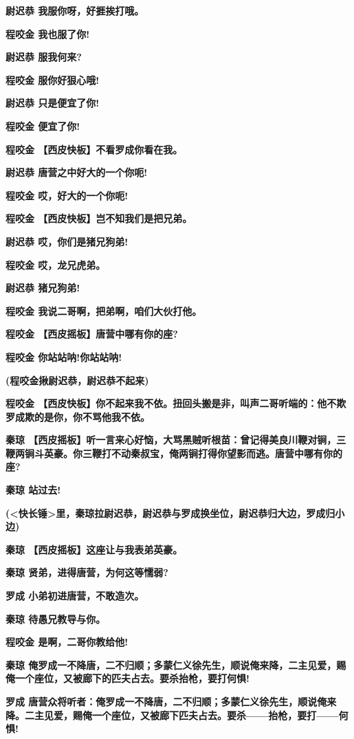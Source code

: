 \textbf{尉迟恭 我服你呀，好捱挨打哦。}

\textbf{程咬金 我也服了你!}

\textbf{尉迟恭 服我何来?}

\textbf{程咬金 服你好狠心哦!}

\textbf{尉迟恭 只是便宜了你!}

\textbf{程咬金 便宜了你!}

\textbf{程咬金 【西皮快板】不看罗成你看在我。}

\textbf{尉迟恭 唐营之中好大的一个你呃!}

\textbf{程咬金 哎，好大的一个你呃!}

\textbf{程咬金 【西皮快板】岂不知我们是把兄弟。}

\textbf{尉迟恭 哎，你们是猪兄狗弟!}

\textbf{程咬金 哎，龙兄虎弟。}

\textbf{尉迟恭 猪兄狗弟!}

\textbf{程咬金 我说二哥啊，把弟啊，咱们大伙打他。}

\textbf{程咬金 【西皮摇板】唐营中哪有你的座?}

\textbf{程咬金 你站站呐!你站站呐!}

\textbf{(程咬金揪尉迟恭，尉迟恭不起来)}

\textbf{程咬金
【西皮快板】你不起来我不依。扭回头搬是非，叫声二哥听端的：他不欺罗成欺的是你，你不骂他我不依。}

\textbf{秦琼
【西皮摇板】听一言来心好恼，大骂黑贼听根苗：曾记得美良川鞭对锏，三鞭两锏斗英豪。你三鞭打不动秦叔宝，俺两锏打得你望影而逃。唐营中哪有你的座?}

\textbf{秦琼 站过去!}

\textbf{(\textless{}快长锤\textgreater{}里，秦琼拉尉迟恭，尉迟恭与罗成换坐位，尉迟恭归大边，罗成归小边)}

\textbf{秦琼 【西皮摇板】这座让与我表弟英豪。}

\textbf{秦琼 贤弟，进得唐营，为何这等懦弱?}

\textbf{罗成 小弟初进唐营，不敢造次。}

\textbf{秦琼 待愚兄教导与你。}

\textbf{程咬金 是啊，二哥你教给他!}

\textbf{秦琼
俺罗成一不降唐，二不归顺；多蒙仁义徐先生，顺说俺来降，二主见爱，赐俺一个座位，又被廊下的匹夫占去。要杀抬枪，要打何惧!}

\textbf{罗成
唐营众将听者：俺罗成一不降唐，二不归顺；多蒙仁义徐先生，顺说俺来降。二主见爱，赐俺一个座位，又被廊下匹夫占去。要杀------抬枪，要打------何惧!}

